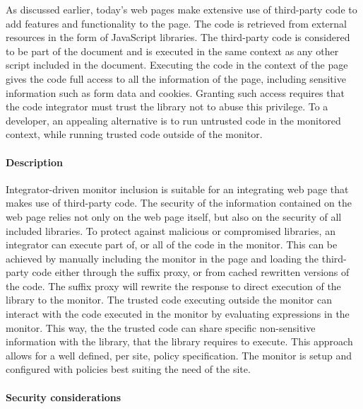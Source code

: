 \documentclass{llncs}
\newcommand{\todo}[1]{\colorbox{red}{\textcolor{white}{\sffamily\bfseries\scriptsize TODO}} \textcolor{red}{#1} \textcolor{red}{$\blacktriangleleft$}}
\begin{document}
As discussed earlier, today's
 web pages make extensive use of third-party code to add features 
and functionality to the page. The code is retrieved from external resources in 
the form of JavaScript libraries. The third-party code is considered to be part 
of the document and is executed in the same context as any other script 
included in the document. Executing the code in the context of the page gives the code full access to all the information 
of the page, including sensitive information such as form data and cookies. 
Granting such access requires that the code integrator must 
trust the library not to abuse this privilege. To a developer, an appealing alternative 
is to run untrusted code in the monitored context, while running trusted code outside of the 
monitor. 

\paragraph{Description}
Integrator-driven monitor inclusion is suitable for an integrating web page 
that makes use of third-party code.
The security of the information contained on the web 
page relies not only on the web page itself, but also on the security of all 
included libraries. To protect against malicious or compromised libraries, 
an integrator can execute part of, or all of the code in the monitor.
This can be achieved by manually including the monitor in the page and loading the 
third-party code either through the suffix proxy, or from cached rewritten 
versions of the code. The suffix proxy will rewrite the 
response to direct execution of the library to the monitor. 
The trusted code executing outside the monitor can interact with the code 
executed in the monitor by evaluating expressions in the monitor. This way, the 
the trusted code can share specific non-sensitive information with the library, 
that the library requires to execute.
This approach allows for a well defined, per site, policy specification.
The monitor is setup and configured with policies best suiting the need of the 
site. 

\paragraph{Security considerations}
\end{document}

